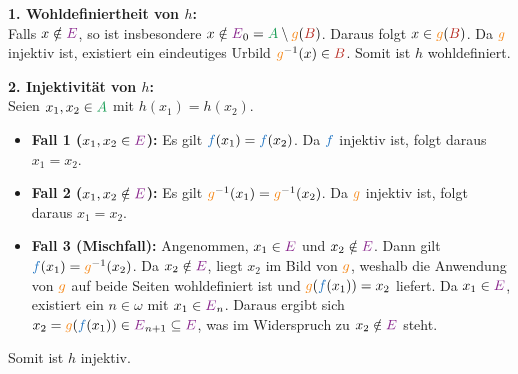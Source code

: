 \begin{math-stroke}
\begin{short-proof}
\begin{center}
\end{center}

\textbf{1. Wohldefiniertheit von $h$:} \\
Falls $x \notin \textcolor{Fuchsia}{E}$, so ist insbesondere $x \notin \textcolor{Fuchsia}{E}_0 = \textcolor{ForestGreen}{A} \setminus \textcolor{BurntOrange}{g}(\textcolor{BrickRed}{B})$. Daraus folgt $x \in \textcolor{BurntOrange}{g}(\textcolor{BrickRed}{B})$. Da $\textcolor{BurntOrange}{g}$ injektiv ist, existiert ein eindeutiges Urbild $\textcolor{BurntOrange}{g}^{-1}(x) \in \textcolor{BrickRed}{B}$. Somit ist $h$ wohldefiniert.

\textbf{2. Injektivität von $h$:} \\
Seien $x_1, x_2 \in \textcolor{ForestGreen}{A}$ mit $h(x_1) = h(x_2)$.
\begin{itemize}
    \item \textbf{Fall 1 ($x_1, x_2 \in \textcolor{Fuchsia}{E}$):} Es gilt $\textcolor{RoyalBlue}{f}(x_1) = \textcolor{RoyalBlue}{f}(x_2)$. Da $\textcolor{RoyalBlue}{f}$ injektiv ist, folgt daraus $x_1 = x_2$.
    \item \textbf{Fall 2 ($x_1, x_2 \notin \textcolor{Fuchsia}{E}$):} Es gilt $\textcolor{BurntOrange}{g}^{-1}(x_1) = \textcolor{BurntOrange}{g}^{-1}(x_2)$. Da $\textcolor{BurntOrange}{g}$ injektiv ist, folgt daraus $x_1 = x_2$.
    \item \textbf{Fall 3 (Mischfall):} Angenommen, $x_1 \in \textcolor{Fuchsia}{E}$ und $x_2 \notin \textcolor{Fuchsia}{E}$. Dann gilt $\textcolor{RoyalBlue}{f}(x_1) = \textcolor{BurntOrange}{g}^{-1}(x_2)$. Da $x_2 \notin \textcolor{Fuchsia}{E}$, liegt $x_2$ im Bild von $\textcolor{BurntOrange}{g}$, weshalb die Anwendung von $\textcolor{BurntOrange}{g}$ auf beide Seiten wohldefiniert ist und $\textcolor{BurntOrange}{g}(\textcolor{RoyalBlue}{f}(x_1)) = x_2$ liefert. Da $x_1 \in \textcolor{Fuchsia}{E}$, existiert ein $n \in \omega$ mit $x_1 \in \textcolor{Fuchsia}{E}_n$. Daraus ergibt sich $x_2 = \textcolor{BurntOrange}{g}(\textcolor{RoyalBlue}{f}(x_1)) \in \textcolor{Fuchsia}{E}_{n+1} \subseteq \textcolor{Fuchsia}{E}$, was im Widerspruch zu $x_2 \notin \textcolor{Fuchsia}{E}$ steht.
\end{itemize}
Somit ist $h$ injektiv.


\end{short-proof}
\end{math-stroke}
